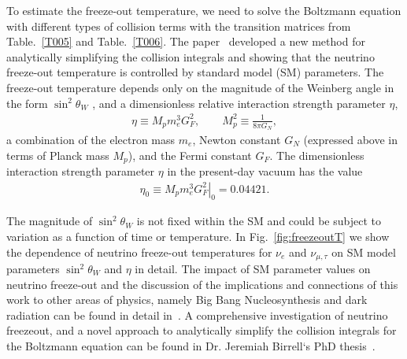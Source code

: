 To estimate the freeze-out temperature, we need to solve the Boltzmann equation with different types of collision terms with the transition matrices from Table.~\ref{T005} and Table.~\ref{T006}. The paper~\cite{Birrell:2014uka} developed a new method for analytically simplifying the collision integrals and showing that the neutrino freeze-out temperature is controlled by standard model (SM) parameters. The freeze-out temperature depends only on the magnitude of the Weinberg angle in the form $\sin^2\theta_W$ , and a dimensionless relative interaction strength parameter $\eta$,
\begin{align}
\eta\equiv M_p m_e^3 G_F^2, \qquad M_p^2\equiv \frac{1}{8\pi G_N}, \end{align}
a combination of the electron mass $m_e$, Newton constant $G_N$ (expressed above in terms of Planck mass $M_p$), and the Fermi constant $G_F$. The dimensionless interaction strength parameter $\eta$ in the present-day vacuum has the value
\begin{align}
\eta_0\equiv \left.M_p m_e^3 G_F^2\right|_0 = 0.04421 .
\end{align}

The magnitude of $\sin^2\theta_W$ is not fixed within the SM and could be subject to variation as a function of time or temperature. In Fig.~\ref{fig:freezeoutT} we show the dependence of neutrino freeze-out temperatures for $\nu_e$ and $\nu_{\mu,\tau}$ on SM model parameters $\sin^2\theta_W$ and $\eta$ in detail. The impact of SM parameter values on neutrino freeze-out and the discussion of the implications and connections of this work to other areas of physics, namely Big Bang Nucleosynthesis and dark radiation can be found in detail in~\cite{Dreiner:2011fp,Boehm:2012gr,Blennow:2012de,Birrell:2014uka}. A comprehensive investigation of neutrino freezeout, and a novel approach to analytically simplify the collision integrals for the Boltzmann equation can be found in Dr. Jeremiah Birrell‘s PhD thesis~\cite{Birrell:2014ona}.


